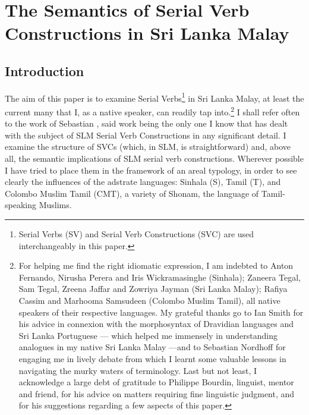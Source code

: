 
\chapter[SLM Serial Verb Constructions]{The Semantics of Serial Verb Constructions in Sri Lanka Malay}



\section{Introduction}
The aim of this paper is to examine Serial Verbs\footnote{Serial
 Verbs (SV) and Serial Verb Constructions (SVC) are used interchangeably in this paper.
} 
in Sri Lanka Malay, at least the current many that I, as a native speaker, can readily tap into.\footnote{For
 helping me find the right idiomatic expression, I am indebted to Anton Fernando, Nirusha Perera and Iris Wickramasinghe (Sinhala); Zaneera Tegal, Sam Tegal, Zreena Jaffar and Zowriya Jayman (Sri Lanka Malay); Rafiya Cassim and Marhooma Samsudeen (Colombo Muslim Tamil), all native speakers of their respective languages. My grateful thanks go to Ian Smith for his advice in connexion with the morphosyntax of Dravidian languages and Sri Lanka Portuguese --- which helped me immensely in understanding analogues in my native Sri Lanka Malay ---and to Sebastian Nordhoff for engaging me in lively debate from which I learnt some valuable lessons in navigating the murky waters of terminology. Last but not least, I acknowledge a large debt of gratitude to Philippe Bourdin, linguist, mentor and friend, for his advice on matters requiring fine linguistic judgment, and for his suggestions regarding a few aspects of this paper.
} 
I shall refer often to the work of Sebastian \citet{Nordhoff2009,Nordhoff2012jpcl}, said work being the only one I know that has dealt with the subject of SLM Serial Verb Constructions in any significant detail. I examine the structure of SVCs (which, in SLM, is straightforward) and, above all, the semantic implications of SLM serial verb constructions. Wherever possible I have tried to place them in the framework of an areal typology, in order to see clearly the influences of the adstrate languages: Sinhala (S), Tamil (T), and Colombo Muslim Tamil (CMT),
a variety of Shonam, the language of Tamil-speaking Muslims. 

